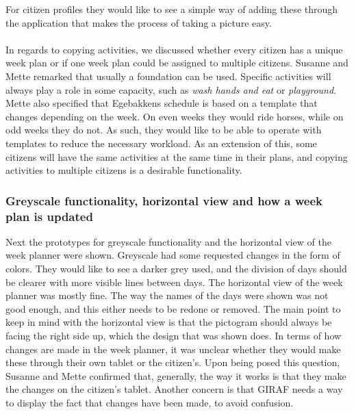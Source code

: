 For citizen profiles they would like to see a simple way of adding these through the application that makes the process of taking a picture easy.
\\\\
In regards to copying activities, we discussed whether every citizen has a unique week plan or if one week plan could be assigned to multiple citizens.
Susanne and Mette remarked that usually a foundation can be used. 
Specific activities will always play a role in some capacity, such as \textit{wash hands and eat} or \textit{playground}.
Mette also specified that Egebakkens schedule is based on a template that changes depending on the week. 
On even weeks they would ride horses, while on odd weeks they do not.
As such, they would like to be able to operate with templates to reduce the necessary workload. 
As an extension of this, some citizens will have the same activities at the same time in their plans, and copying activities to multiple citizens is a desirable functionality.


\subsubsection{Greyscale functionality, horizontal view and how a week plan is updated}
Next the prototypes for greyscale functionality and the horizontal view of the week planner were shown.
Greyscale had some requested changes in the form of colors.
They would like to see a darker grey used, and the division of days should be clearer with more visible lines between days.
The horizontal view of the week planner was mostly fine. 
The way the names of the days were shown was not good enough, and this either needs to be redone or removed.
The main point to keep in mind with the horizontal view is that the pictogram should always be facing the right side up, which the design that was shown does.
In terms of how changes are made in the week planner, it was unclear whether they would make these through their own tablet or the citizen's.
Upon being posed this question, Susanne and Mette confirmed that, generally, the way it works is that they make the changes on the citizen's tablet.
Another concern is that GIRAF needs a way to display the fact that changes have been made, to avoid confusion. 

